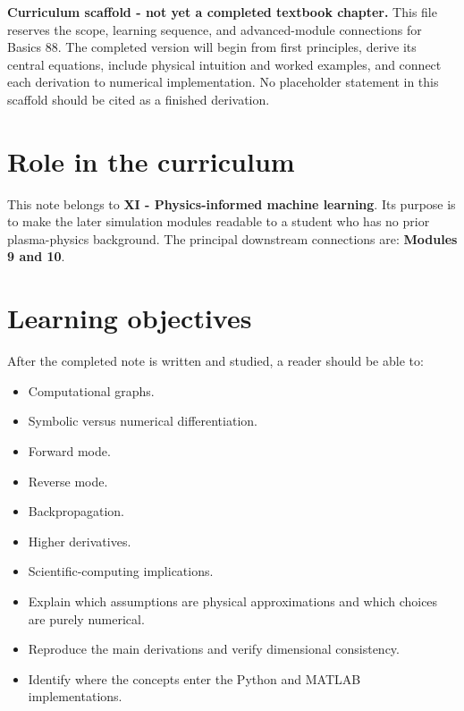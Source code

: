 \documentclass[11pt]{article}
\begin{document}

\begin{overviewbox}
\textbf{Curriculum scaffold - not yet a completed textbook chapter.} This file reserves the scope, learning sequence, and advanced-module connections for Basics 88. The completed version will begin from first principles, derive its central equations, include physical intuition and worked examples, and connect each derivation to numerical implementation. No placeholder statement in this scaffold should be cited as a finished derivation.
\end{overviewbox}

\ProjectTOC

\section{Role in the curriculum}
This note belongs to \textbf{XI - Physics-informed machine learning}. Its purpose is to make the later simulation modules readable to a student who has no prior plasma-physics background. The principal downstream connections are: \textbf{Modules 9 and 10}.

\section{Learning objectives}
After the completed note is written and studied, a reader should be able to:
\begin{itemize}[leftmargin=1.6em]
\item Computational graphs.
\item Symbolic versus numerical differentiation.
\item Forward mode.
\item Reverse mode.
\item Backpropagation.
\item Higher derivatives.
\item Scientific-computing implications.
\item Explain which assumptions are physical approximations and which choices are purely numerical.
\item Reproduce the main derivations and verify dimensional consistency.
\item Identify where the concepts enter the Python and MATLAB implementations.
\end{itemize}
\end{document}
